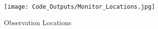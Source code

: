 
\begin{figure} 
\centering  
\texttt{[image: Code\_Outputs/Monitor\_Locations.jpg]} 
\caption{\label{fig:MonitorLocations}Observation Locations} 
\end{figure} 
 
